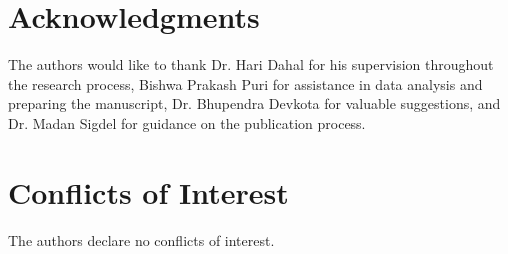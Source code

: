 \documentclass[a4paper,12pt]{article}
\begin{document}
\section*{Acknowledgments}
The authors would like to thank Dr. Hari Dahal for his supervision throughout the research process, Bishwa Prakash Puri for assistance in data analysis and preparing the manuscript, Dr. Bhupendra Devkota for valuable suggestions, and Dr. Madan Sigdel for guidance on the publication process.


\section*{Conflicts of Interest}
The authors declare no conflicts of interest.



\end{document}
